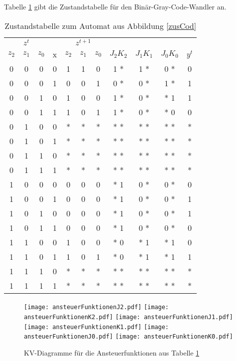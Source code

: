Tabelle \ref{zusTab} gibt die Zustandstabelle für den Binär-Gray-Code-Wandler an.
\begin{table}
\centering
\label{zusTab}
\begin{tabular}{ccc|c|ccc|ccc|c}
\multicolumn{3}{c|}{$z^t$}  & & \multicolumn{3}{c|}{$z^{t+1}$} & \multicolumn{3}{c|}{}\\
$z_2$ & $z_1$ & $z_0$ & x & $z_2$ & $z_1$ & $z_0$ & $J_2K_2$ & $J_1K_1$ & $J_0K_0$ & $y^t$\\ \hline
0 & 0 & 0 & 0 & 1 & 1 & 0 & 1 * & 1 * & 0 * & 0\\
0 & 0 & 0 & 1 & 0 & 0 & 1 & 0 * & 0 * & 1 * & 1\\
0 & 0 & 1 & 0 & 1 & 0 & 0 & 1 * & 0 * & * 1 & 1\\
0 & 0 & 1 & 1 & 1 & 0 & 1 & 1 * & 0 * & * 0 & 0\\
0 & 1 & 0 & 0 & * & * & * & * * & * * & * * & *\\
0 & 1 & 0 & 1 & * & * & * & * * & * * & * * & *\\
0 & 1 & 1 & 0 & * & * & * & * * & * * & * * & *\\
0 & 1 & 1 & 1 & * & * & * & * * & * * & * * & *\\
1 & 0 & 0 & 0 & 0 & 0 & 0 & * 1 & 0 * & 0 * & 0\\
1 & 0 & 0 & 1 & 0 & 0 & 0 & * 1 & 0 * & 0 * & 1\\
1 & 0 & 1 & 0 & 0 & 0 & 0 & * 1 & 0 * & 0 * & 1\\
1 & 0 & 1 & 1 & 0 & 0 & 0 & * 1 & 0 * & 0 * & 0\\
1 & 1 & 0 & 0 & 1 & 0 & 0 & * 0 & * 1 & * 1 & 0\\
1 & 1 & 0 & 1 & 1 & 0 & 1 & * 0 & * 1 & * 1 & 1\\
1 & 1 & 1 & 0 & * & * & * & * * & * * & * * & *\\
1 & 1 & 1 & 1 & * & * & * & * * & * * & * * & *\\
\end{tabular}
\caption{Zustandstabelle zum Automat aus Abbildung \ref{zusCod}}
\end{table}


\begin{figure}[htp]
	\centering
	\texttt{[image: ansteuerFunktionenJ2.pdf]}
	\texttt{[image: ansteuerFunktionenK2.pdf]}
	\texttt{[image: ansteuerFunktionenJ1.pdf]}
	\texttt{[image: ansteuerFunktionenK1.pdf]}
	\texttt{[image: ansteuerFunktionenJ0.pdf]}
	\texttt{[image: ansteuerFunktionenK0.pdf]}
	\caption{KV-Diagramme für die Ansteuerfunktionen aus Tabelle \ref{zusTab}}
	\label{ansFunKv}
\end{figure}

